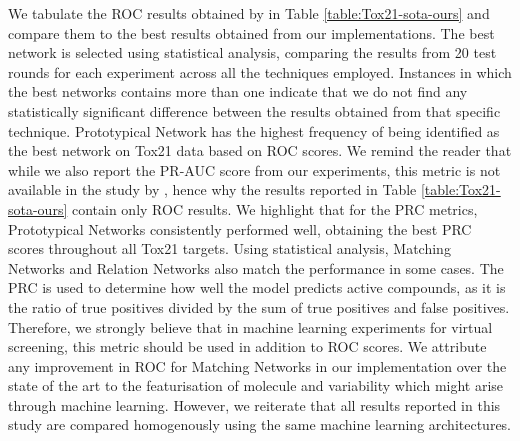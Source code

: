 We tabulate the ROC results obtained by \citet{altae2017low} in Table \ref{table:Tox21-sota-ours} and compare them to the best results obtained from our implementations. The best network is selected using statistical analysis, comparing the results from 20 test rounds for each experiment across all the techniques employed. Instances in which the best networks contains more than one indicate that we do not find any statistically significant difference between the results obtained from that specific technique. Prototypical Network has the highest frequency of being identified as the best network on Tox21 data based on ROC scores. We remind the reader that while we also report the PR-AUC score from our experiments, this metric is not available in the study by \citet{altae2017low}, hence why the results reported in Table \ref{table:Tox21-sota-ours} contain only ROC results. We highlight that for the PRC metrics, Prototypical Networks consistently performed well, obtaining the best PRC scores throughout all Tox21 targets. Using statistical analysis, Matching Networks and Relation Networks also match the performance in some cases. The PRC is used to determine how well the model predicts active compounds, as it is the ratio of true positives divided by the sum of true positives and false positives. Therefore, we strongly believe that in machine learning experiments for virtual screening, this metric should be used in addition to ROC scores. We attribute any improvement in ROC for Matching Networks in our implementation over the state of the art to the featurisation of molecule and variability which might arise through machine learning. However, we reiterate that all results reported in this study are compared homogenously using the same machine learning architectures. 

